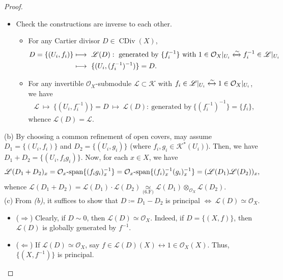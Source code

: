 \documentclass[11pt,a4paper,footinclude=true,headinclude=true]{scrbook} %
\DeclareMathOperator{\CDiv}{CDiv}
\newcommand{\KK}{\mathscr{K}}
\newcommand{\LL}{\mathscr{L}}
\newcommand{\OO}{\mathcal{O}}
\newcommand{\<}{\langle}
\newcommand{\>}{\rangle}
\newcommand{\spn}{\mathchar`-\mathrm{span}}
\begin{document}
\begin{proof}
\begin{itemize}
        \item[(III)] Check the constructions are inverse to each other.
        \begin{itemize}
            \item For any Cartier divisor $D\in\CDiv(X)$,
            \begin{align*}
                D=\{(U_i,f_i)\} &\longmapsto\ \LL(D):\ \text{generated by $\{f_i^{-1}\}$ with}\ 1\in\OO_X|_{U_i}\xleftrightarrow{\sim}f_i^{-1}\in\LL|_{U_i}\\
                &\longmapsto\ \{(U_i,(f_i^{-1})^{-1})\}=D.
            \end{align*}
            \item For any invertible $\OO_X$-submodule $\LL\subset\KK$ with $f_i\in\LL|_{U_i}\xleftrightarrow{\sim}1\in\OO_X|_{U_i}$, we have
            \begin{align*}
                \LL\ \longmapsto\ \{(U_i,f_i^{-1})\}=D\ \longmapsto\ \LL(D):\ \text{generated by}\ \{(f_i^{-1})^{-1}\}=\{f_i\},
            \end{align*}
            whence $\LL(D)=\LL$.
        \end{itemize}
    \end{itemize}
    
    (b) By choosing a common refinement of open covers, may assume $D_1=\{(U_i,f_i)\}$ and $D_2=\{(U_i,g_i)\}$ (where $f_i,g_i\in\KK^\ast(U_i)$). Then, we have $D_1+D_2=\{(U_i,f_ig_i)\}$. Now, for each $x\in X$, we have
    \begin{align*}
        \LL(D_1+D_2)_x=\OO_x\spn\{(f_ig_i)^{-1}_x\}=\OO_x\spn\{(f_i)^{-1}_x(g_i)^{-1}_x\}=(\LL(D_1)\LL(D_2))_x,
    \end{align*}
    whence $\LL(D_1+D_2)=\LL(D_1)\cdot\LL(D_2)\underset{\text{(6.F)}}{\simeq}\LL(D_1)\otimes_{\OO_X}\LL(D_2)$.\\
    
    (c) From \textit{(b)}, it suffices to show that $D\coloneqq D_1-D_2$ is principal $\Longleftrightarrow\ \LL(D)\simeq\OO_X$.
    \begin{itemize}
        \item ($\Rightarrow$) Clearly, if $D\sim0$, then $\LL(D)\simeq\OO_X$. Indeed, if $D=\{(X,f)\}$, then $\LL(D)$ is globally generated by $f^{-1}$.
        \item ($\Leftarrow$) If $\LL(D)\simeq\OO_X$, say $f\in\LL(D)(X)\longleftrightarrow1\in\OO_X(X)$. Thus, $\{(X,f^{-1})\}$ is principal.
    \end{itemize}
\end{proof}
\end{document}
